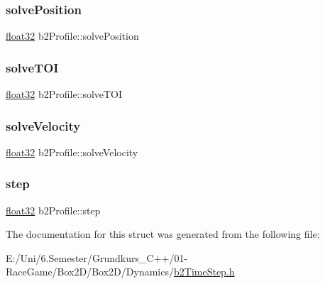 \mbox{\label{structb2_profile_a78e22d104226863492ebab9ea30a9ed9}} 
\subsubsection{\texorpdfstring{solvePosition}{solvePosition}}
{\footnotesize\ttfamily \mbox{\hyperlink{b2_settings_8h_aacdc525d6f7bddb3ae95d5c311bd06a1}{float32}} b2\+Profile\+::solve\+Position}

\mbox{\label{structb2_profile_a74e8ea0c6ca39250d639ec94b69a803e}} 
\subsubsection{\texorpdfstring{solveTOI}{solveTOI}}
{\footnotesize\ttfamily \mbox{\hyperlink{b2_settings_8h_aacdc525d6f7bddb3ae95d5c311bd06a1}{float32}} b2\+Profile\+::solve\+T\+OI}

\mbox{\label{structb2_profile_ae4d29a19b38de81621bccdbf75595233}} 
\subsubsection{\texorpdfstring{solveVelocity}{solveVelocity}}
{\footnotesize\ttfamily \mbox{\hyperlink{b2_settings_8h_aacdc525d6f7bddb3ae95d5c311bd06a1}{float32}} b2\+Profile\+::solve\+Velocity}

\mbox{\label{structb2_profile_a5b93de1d56902224868beacc478b9863}} 
\subsubsection{\texorpdfstring{step}{step}}
{\footnotesize\ttfamily \mbox{\hyperlink{b2_settings_8h_aacdc525d6f7bddb3ae95d5c311bd06a1}{float32}} b2\+Profile\+::step}



The documentation for this struct was generated from the following file\+:\begin{DoxyCompactItemize}
\item 
E\+:/\+Uni/6.\+Semester/\+Grundkurs\+\_\+\+C++/01-\/\+Race\+Game/\+Box2\+D/\+Box2\+D/\+Dynamics/\mbox{\hyperlink{b2_time_step_8h}{b2\+Time\+Step.\+h}}\end{DoxyCompactItemize}
